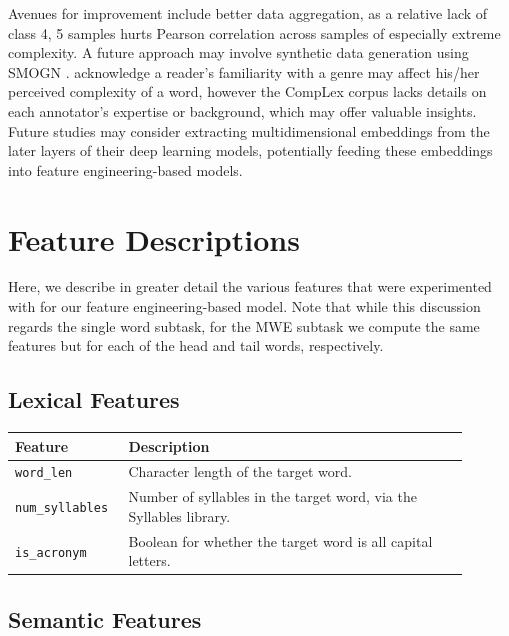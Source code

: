 \documentclass{dcthesis}
\theoremstyle{definition}
\theoremstyle{remark}
\begin{document}
Avenues for improvement include better data aggregation, as a relative lack of class 4, 5 samples hurts Pearson correlation across samples of especially extreme complexity. A future approach may involve synthetic data generation using SMOGN \citep{branco2017smogn}. \citet{shardlow2020complex} acknowledge a reader's familiarity with a genre may affect his/her perceived complexity of a word, however the CompLex corpus lacks details on each annotator's expertise or background, which may offer valuable insights. Future studies may consider extracting multidimensional embeddings from the later layers of their deep learning models, potentially feeding these embeddings into feature engineering-based models.

\appendix

\chapter{Feature Descriptions}
\label{appendix:descriptions}

Here, we describe in greater detail the various features that were experimented with for our feature engineering-based model. Note that while this discussion regards the single word subtask, for the MWE subtask we compute the same features but for each of the head and tail words, respectively.

\section{Lexical Features}

\begin{table}[H]
  \centering
  \begin{tabular}{>{\centering\arraybackslash}p{0.2\linewidth}>{\arraybackslash}p{0.7\linewidth}}
    \textbf{Feature} & \textbf{Description} \\ \hline 
    \texttt{word\_len} & Character length of the target word.\\
    \hline 
    \texttt{num\_syllables} & Number of syllables in the target word, via the Syllables library.\\
    \hline 
    \texttt{is\_acronym} & Boolean for whether the target word is all capital letters.\\
  \end{tabular}
  \label{lexical_features}
\end{table}

\section{Semantic Features}
\end{document}
